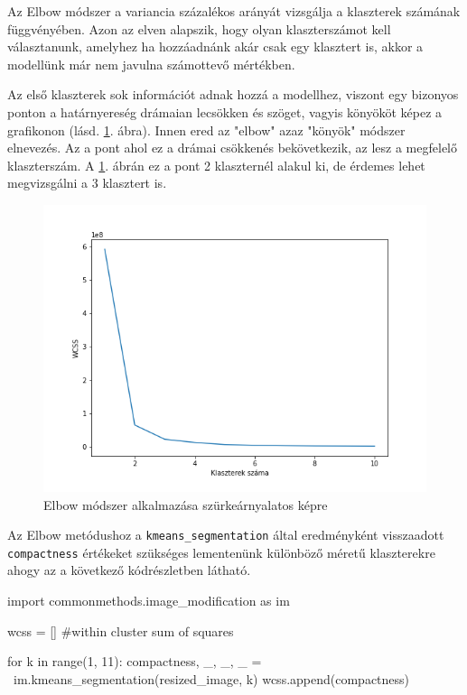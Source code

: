 
Az Elbow módszer a variancia százalékos arányát vizsgálja a klaszterek számának függvényében. Azon az elven alapszik, hogy olyan klaszterszámot kell választanunk, amelyhez ha hozzáadnánk akár csak egy klasztert is, akkor a modellünk már nem javulna számottevő mértékben.

Az első klaszterek sok információt adnak hozzá a modellhez, viszont egy bizonyos ponton a határnyereség drámaian lecsökken és szöget, vagyis könyököt képez a grafikonon (lásd. \ref{fig:elbow_grayscale}. ábra). Innen ered az "elbow" azaz "könyök" módszer elnevezés. Az a pont ahol ez a drámai csökkenés bekövetkezik, az lesz a megfelelő klaszterszám. A \ref{fig:elbow_grayscale}. ábrán ez a pont 2 klaszternél alakul ki, de érdemes lehet megvizsgálni a 3 klasztert is. \cite{elbow}

\begin{figure}[h]
\centering
\includegraphics[scale=0.7]{images/elbow_grayscale.png}
\caption{Elbow módszer alkalmazása szürkeárnyalatos képre}
\label{fig:elbow_grayscale}
\end{figure}

Az Elbow metódushoz a \texttt{kmeans\_segmentation} által eredményként visszaadott \texttt{compactness} értékeket szükséges lementenünk különböző méretű klaszterekre ahogy az a következő kódrészletben látható.
\begin{python}
import commonmethods.image_modification as im

wcss = []   #within cluster sum of squares

for k in range(1, 11):
    compactness, _, _, _ = \
        im.kmeans_segmentation(resized_image, k)
    wcss.append(compactness)
\end{python}

